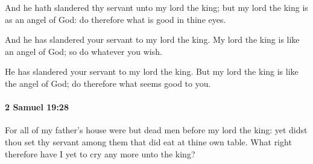 			\begin{versebox}
					\item[BHS] 
					\item[ASV] And he hath slandered thy servant unto my lord the king; but my lord the king is as an angel of God: do therefore what is good in thine eyes.
					\item[NIV] And he has slandered your servant to my lord the king. My lord the king is like an angel of God; so do whatever you wish.
					\item[NRSV] He has slandered your servant to my lord the king. But my lord the king is like the angel of God; do therefore what seems good to you.
			\end{versebox}

		\paragraph{2 Samuel 19:28} %
			\label{2SAMUEL-19-28}

			For all of my father’s house were but dead men before my lord the king: yet didst thou set thy servant among them that did eat at thine own table. What right therefore have I yet to cry any more unto the king?

